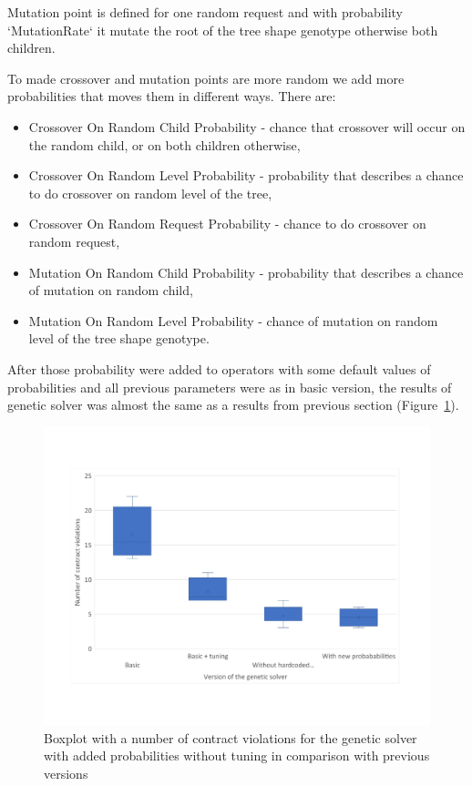Mutation point is defined for one random request and with probability `MutationRate` it mutate the root of the tree shape genotype otherwise both children.

To made crossover and mutation points are more random we add more probabilities that moves them in different ways.
There are:
\begin{itemize}
	\item Crossover On Random Child Probability - chance that crossover will occur on the random child, or on both children otherwise,
	\item Crossover On Random Level Probability - probability that describes a chance to do crossover on random level of the tree, 
	\item Crossover On Random Request Probability - chance to do crossover on random request,
	\item Mutation On Random Child Probability - probability that describes a chance of mutation on random child,
	\item Mutation On Random Level Probability - chance of mutation on random level of the tree shape genotype.
\end{itemize}

After those probability were added to operators with some default values of probabilities and all previous parameters were as in basic version, the results of genetic solver was almost the same as a results from previous section (Figure~\ref{fig:boxplotsolverNewParameters}).
\begin{figure}
	\centering
	\includegraphics[width=\textwidth]{images/BoxPlotSolverNewParameters.pdf}
	\caption[Boxplot with a number of contract violations for the genetic solver with added probabilities without tuning in comparison with previous versions]{Boxplot with a number of contract violations for the genetic solver with added probabilities without tuning in comparison with previous versions}
	\label{fig:boxplotsolverNewParameters}
\end{figure}

